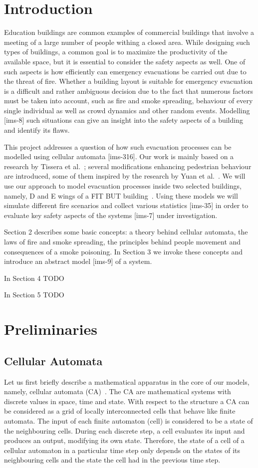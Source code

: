 \section{Introduction}
Education buildings are common examples of commercial buildings that involve a
meeting of a large number of people withing a closed area.
While designing such types of buildings, a common goal is to maximize the
productivity of the available space, but it is essential to consider the
safety aspects as well.
One of such aspects is how efficiently can emergency evacuations be carried out
due to the threat of fire.
Whether a building layout is suitable for emergency evacuation is a difficult
and rather ambiguous decision due to the fact that numerous factors must be
taken into account, such as fire and smoke spreading, behaviour of every single
individual as well as crowd dynamics and other random events.
Modelling [ims-8] such situations can give an insight into the safety aspects
of a building and identify its flaws.

This project addresses a question of how such evacuation processes can be
modelled using cellular automata [ims-316].
Our work is mainly based on a research by Tissera et al.~\cite{Tissera1};
several modifications enhancing pedestrian behaviour are introduced, some of
them inspired by the research by Yuan et al.~\cite{Yuan}.
We will use our approach to model evacuation processes inside two selected
buildings, namely, D and E wings of a FIT BUT building~\cite{FIT}.
Using these models we will simulate different fire scenarios and collect
various statistics [ims-35] in order to evaluate key safety aspects of the
systems [ims-7] under investigation.

Section 2 describes some basic concepts: a theory behind cellular automata,
the laws of fire and smoke spreading, the principles behind people movement and
consequences of a smoke poisoning.
In Section 3 we invoke these concepts and introduce an abstract model [ims-9]
of a system.

{In Section 4 TODO}

{In Section 5 TODO}

\section{Preliminaries}
\subsection{Cellular Automata}
Let us first briefly describe a mathematical apparatus in the core of our
models, namely, cellular automata (CA)~\cite{Wolfram}.
The CA are mathematical systems with discrete values in space, time and
state.
With respect to the structure a CA can be considered as a grid of locally
interconnected cells that behave like finite automata.
The input of each finite automaton (cell) is considered to be a state of the
neighbouring cells.
During each discrete step, a cell evaluates its input and produces an
output, modifying its own state.
Therefore, the state of a cell of a cellular automaton in a particular time
step only depends on the states of its neighbouring cells and the state the
cell had in the previous time step.

